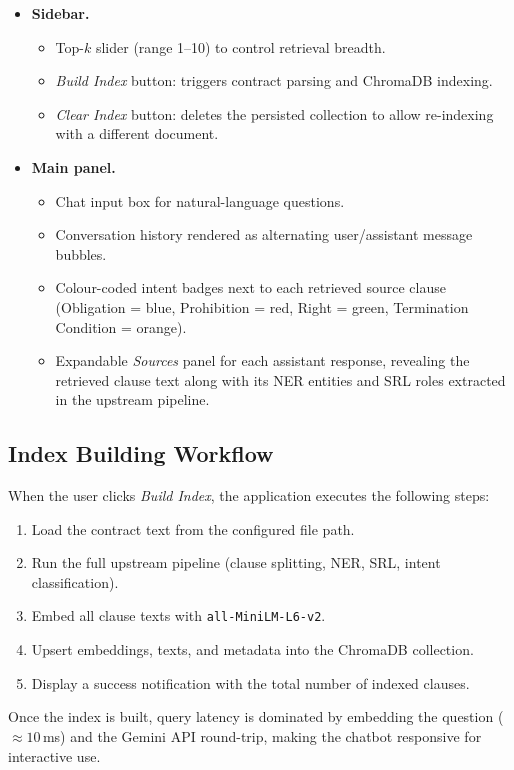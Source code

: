\documentclass[assignment.tex]{subfiles}
\begin{document}
\begin{itemize}[leftmargin=*, itemsep=3pt]
    \item \textbf{Sidebar.}
    \begin{itemize}
        \item Top-$k$ slider (range 1--10) to control retrieval breadth.
        \item \textit{Build Index} button: triggers contract parsing and ChromaDB
              indexing.
        \item \textit{Clear Index} button: deletes the persisted collection to
              allow re-indexing with a different document.
    \end{itemize}
    \item \textbf{Main panel.}
    \begin{itemize}
        \item Chat input box for natural-language questions.
        \item Conversation history rendered as alternating user/assistant message
              bubbles.
        \item Colour-coded intent badges next to each retrieved source clause
              (Obligation = blue, Prohibition = red, Right = green,
              Termination Condition = orange).
        \item Expandable \textit{Sources} panel for each assistant response,
              revealing the retrieved clause text along with its NER entities and
              SRL roles extracted in the upstream pipeline.
    \end{itemize}
\end{itemize}

\subsection{Index Building Workflow}

When the user clicks \textit{Build Index}, the application executes the following
steps:

\begin{enumerate}[leftmargin=*, itemsep=3pt]
    \item Load the contract text from the configured file path.
    \item Run the full upstream pipeline (clause splitting, NER, SRL, intent
          classification).
    \item Embed all clause texts with \texttt{all-MiniLM-L6-v2}.
    \item Upsert embeddings, texts, and metadata into the ChromaDB collection.
    \item Display a success notification with the total number of indexed clauses.
\end{enumerate}

Once the index is built, query latency is dominated by embedding the question
(${\approx}10$\,ms) and the Gemini API round-trip, making the chatbot responsive
for interactive use.
\end{document}
